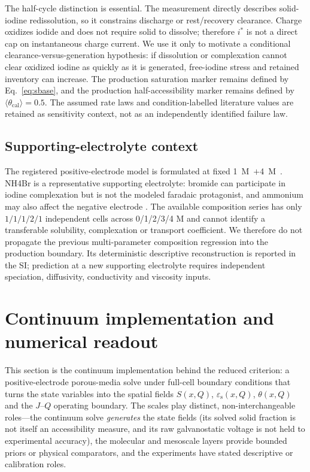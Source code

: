 \documentclass[11pt]{article}
\newcommand{\epss}{\varepsilon_{\mathrm{s}}}
\newcommand{\thetacal}{\theta_{\mathrm{cal}}}
\begin{document}
The half-cycle distinction is essential. The measurement directly describes solid-iodine redissolution, so it
constrains discharge or rest/recovery clearance. Charge oxidizes iodide and does not require solid to dissolve;
therefore $i^{*}$ is not a direct cap on instantaneous charge current. We use it only to motivate a conditional
clearance-versus-generation hypothesis: if dissolution or complexation cannot clear oxidized iodine as quickly
as it is generated, free-iodine stress and retained inventory can increase. The production saturation marker remains
defined by Eq.~\eqref{eq:sbase}, and the production half-accessibility marker remains defined by
$\langle\thetacal\rangle=0.5$. The assumed rate laws and condition-labelled literature values are retained as
sensitivity context, not as an independently identified failure law.

\subsection{Supporting-electrolyte context}
\label{sec:compmodule}
The registered positive-electrode model is formulated at fixed
\SI{1}{M}~$+$\SI{4}{M}~. NH4Br is a representative supporting electrolyte: bromide can
participate in iodine complexation but is not the modeled faradaic protagonist, and ammonium may also affect
the negative electrode \citep{Jian2021,Park2021,Udom2025}. The available composition series has only
$1/1/1/2/1$ independent cells across 0/1/2/3/4 M and cannot identify a transferable solubility,
complexation or transport coefficient. We therefore do not propagate the previous multi-parameter
composition regression into the production boundary. Its deterministic descriptive reconstruction is reported
in the SI; prediction at a new supporting electrolyte requires independent speciation, diffusivity,
conductivity and viscosity inputs.

\section{Continuum implementation and numerical readout}
\label{sec:multiscale}
This section is the continuum implementation behind the reduced criterion: a positive-electrode porous-media
solve under full-cell boundary conditions
that turns the state variables into the spatial fields $S(x,Q)$, $\epss(x,Q)$, $\theta(x,Q)$ and the
$J$--$Q$ operating boundary. The scales play distinct, non-interchangeable roles---the continuum solve
\emph{generates} the state fields (its solved solid fraction is not itself an accessibility measure, and its
raw galvanostatic voltage is not held to experimental accuracy), the molecular and mesoscale layers provide
bounded priors or physical comparators, and the experiments have stated descriptive or calibration roles.
\end{document}
